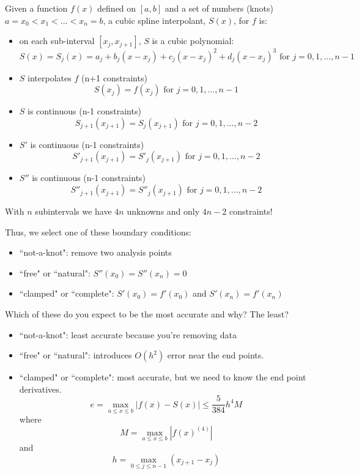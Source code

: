 \documentclass[12pt]{article}
\begin{document}
Given a function $f(x)$ defined on $[a,b]$ and a set of numbers (knots) $a=x_0 < x_1 < ... < x_n = b$, a cubic spline interpolant, $S(x)$, for $f$ is:
\begin{itemize}
\item on each sub-interval $[x_j, x_{j+1}]$, $S$ is a cubic polynomial:
\[S(x) = S_j(x) = a_j + b_j(x-x_j) + c_j(x-x_j)^2 + d_j(x-x_j)^3 \text{ for } j = 0, 1, ..., n-1\]

\item $S$ interpolates $f$ (n+1 constraints)
\[S(x_j) = f(x_j)\text{ for } j = 0, 1, ..., n-1\]

\item $S$ is continuous (n-1 constraints)
\[S_{j+1}(x_{j+1}) = S_{j}(x_{j+1})\text{ for } j = 0, 1, ..., n-2\]

\item $S'$ is continuous (n-1 constraints)
\[S'_{j+1}(x_{j+1}) = S'_{j}(x_{j+1})\text{ for } j = 0, 1, ..., n-2\]

\item $S''$ is continuous (n-1 constraints)
\[S''_{j+1}(x_{j+1}) = S''_{j}(x_{j+1})\text{ for } j = 0, 1, ..., n-2\]
\end{itemize}
%
With $n$ subintervals we have $4n$ unknowns and only $4n-2$ constraints!

Thus, we select one of these boundary conditions:
\begin{itemize}
\item ``not-a-knot": remove two analysis points
\item ``free" or ``natural": $S''(x_0) = S''(x_n) = 0$ 
\item ``clamped" or ``complete": $S'(x_0) = f'(x_0)$ and $S'(x_n) = f'(x_n)$ 
\end{itemize}

Which of these do you expect to be the most accurate and why? The least?
\begin{itemize}
\item ``not-a-knot": least accurate because you're removing data
\item ``free" or ``natural": introduces $O(h^2)$ error near the end points.
\item ``clamped" or ``complete": most accurate, but we need to know the end point derivatives.
\[e = \max_{a \leq x \leq b} |f(x) - S(x)| \leq \frac{5}{384}h^4 M\]
where
\[M = \max_{a \leq x \leq b} |f(x)^{(4)}|\]
and
\[h = \max_{0 \leq j \leq n-1} (x_{j+1} - x_{j})\]
\end{itemize}
\end{document}
